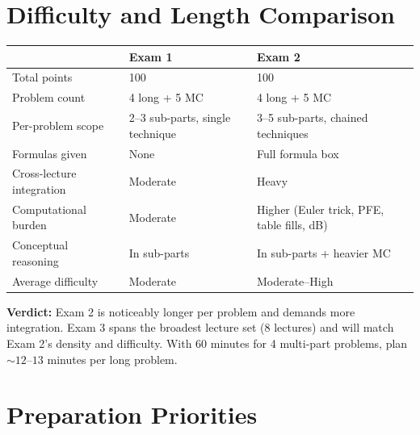 \documentclass[11pt]{article}
\begin{document}
\section{Difficulty and Length Comparison}

\begin{longtable}{@{}p{4.2cm}p{5.3cm}p{5.3cm}@{}}
\toprule
 & Exam 1 & Exam 2 \\
\midrule
Total points & 100 & 100 \\
Problem count & 4 long + 5 MC & 4 long + 5 MC \\
Per-problem scope & 2--3 sub-parts, single technique & 3--5 sub-parts, chained techniques \\
Formulas given & None & Full formula box \\
Cross-lecture integration & Moderate & Heavy \\
Computational burden & Moderate & Higher (Euler trick, PFE, table fills, dB) \\
Conceptual reasoning & In sub-parts & In sub-parts + heavier MC \\
Average difficulty & Moderate & Moderate--High \\
\bottomrule
\end{longtable}

\noindent\textbf{Verdict:} Exam 2 is noticeably longer per problem and demands more integration. Exam 3 spans the broadest lecture set (8 lectures) and will match Exam 2's density and difficulty. With 60 minutes for 4 multi-part problems, plan $\sim 12$--$13$ minutes per long problem.

\section{Preparation Priorities}
\end{document}

